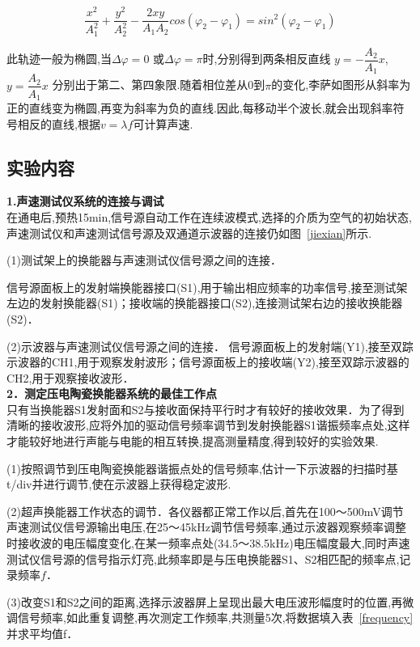 \documentclass[12pt,a4paper,oneside,UTF8]{ctexart}
\begin{document}
$$ \dfrac{x^2}{A_1^2} +\dfrac{y^2}{A_2^2} - \dfrac{2xy}{A_1 A_2}cos(\varphi_2 - \varphi_1) = sin^2(\varphi_2 - \varphi_1) $$

此轨迹一般为椭圆,当$\Delta \varphi=0$ 或$\Delta \varphi = \pi $时,分别得到两条相反直线 $y=-\dfrac{A_2}{A_1}x$, $y=\dfrac{A_2}{A_1}x$
分别出于第二、第四象限.随着相位差从0到$\pi$的变化,李萨如图形从斜率为正的直线变为椭圆,再变为斜率为负的直线.因此,每移动半个波长,就会出现斜率符号相反的直线,根据$v=\lambda f$可计算声速.

\subsection{实验内容}

\textbf{1.声速测试仪系统的连接与调试}\\

在通电后,预热15min,信号源自动工作在连续波模式,选择的介质为空气的初始状态,声速测试仪和声速测试信号源及双通道示波器的连接仍如图~\ref{jiexian}所示.

(1)测试架上的换能器与声速测试仪信号源之间的连接．

信号源面板上的发射端换能器接口(S1),用于输出相应频率的功率信号,接至测试架左边的发射换能器(S1)；接收端的换能器接口(S2),连接测试架右边的接收换能器(S2)．

(2)示波器与声速测试仪信号源之间的连接．
信号源面板上的发射端(Y1),接至双踪示波器的CH1,用于观察发射波形；信号源面板上的接收端(Y2),接至双踪示波器的CH2,用于观察接收波形．\\

\textbf{2．测定压电陶瓷换能器系统的最佳工作点}\\

只有当换能器S1发射面和S2与接收面保持平行时才有较好的接收效果．为了得到清晰的接收波形,应将外加的驱动信号频率调节到发射换能器S1谐振频率点处,这样才能较好地进行声能与电能的相互转换,提高测量精度,得到较好的实验效果.

(1)按照调节到压电陶瓷换能器谐振点处的信号频率,估计一下示波器的扫描时基t/div并进行调节,使在示波器上获得稳定波形.

(2)超声换能器工作状态的调节．各仪器都正常工作以后,首先在100～500mV调节声速测试仪信号源输出电压,在25～45kHz调节信号频率,通过示波器观察频率调整时接收波的电压幅度变化,在某一频率点处(34.5～38.5kHz)电压幅度最大,同时声速测试仪信号源的信号指示灯亮,此频率即是与压电换能器S1、S2相匹配的频率点,记录频率$f$．

(3)改变S1和S2之间的距离,选择示波器屏上呈现出最大电压波形幅度时的位置,再微调信号频率,如此重复调整,再次测定工作频率,共测量5次,将数据填入表~\ref{frequency}并求平均值f．\\
\end{document}
